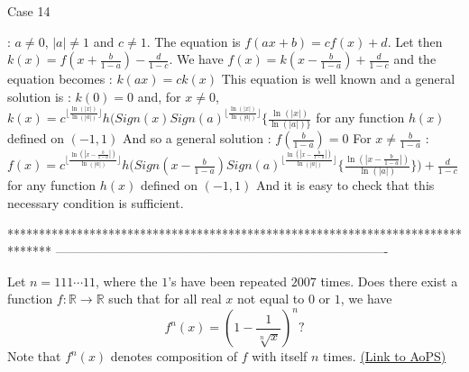 \begin{mysolution}
\begin{underlined}Case 14\end{underlined}: $ a\neq 0$, $ |a|\neq 1$ and $ c\neq 1$. The equation is $ f(ax + b) = cf(x) + d$. Let then $ k(x) = f(x + \frac {b}{1 - a}) - \frac {d}{1 - c}$. We have $ f(x) = k(x - \frac {b}{1 - a}) + \frac {d}{1 - c}$ and the equation becomes : $ k(ax) = ck(x)$
This equation is well known and a general solution is :
$ k(0) = 0$ and, for $ x\neq 0$, $ k(x) = c^{\lfloor\frac {\ln(|x|)}{\ln(|a|)}\rfloor}h(Sign(x)Sign(a)^{\lfloor\frac {\ln(|x|)}{\ln(|a|)}\rfloor}{\{\frac {\ln(|x|)}{\ln(|a|)\}}}$ for any function $ h(x)$ defined on $ ( - 1,1)$
And so a general solution :
$ f(\frac {b}{1 - a}) = 0$
For $ x\neq\frac {b}{1 - a}$ : $ f(x) = c^{\lfloor\frac {\ln(|x - \frac {b}{1 - a}|)}{\ln(|a|)}\rfloor}h(Sign(x - \frac {b}{1 - a})Sign(a)^{\lfloor\frac {\ln(|x - \frac {b}{1 - a}|)}{\ln(|a|)}\rfloor}{\{\frac {\ln(|x - \frac {b}{1 - a}|)}{\ln(|a|)}\}) + \frac {d}{1 - c}}$ for any function $ h(x)$ defined on $ ( - 1,1)$
And it is easy to check that this necessary condition is sufficient.
\end{mysolution}
*******************************************************************************
-------------------------------------------------------------------------------

\begin{problem}
	Let $ n=111\cdots11$, where the $1$'s have been repeated $2007$ times. Does there exist a function $f: \mathbb R \to \mathbb R$ such that for all real $x$ not equal to $0$ or $1$, we have
\[f^n(x) = \left(1 - \frac{1}{\sqrt[n]{x}}\right)^{n}?\]
Note that $f^n(x)$ denotes composition of $f$ with itself $n$ times.
	\flushright \href{https://artofproblemsolving.com/community/c6h169311}{(Link to AoPS)}
\end{problem}



